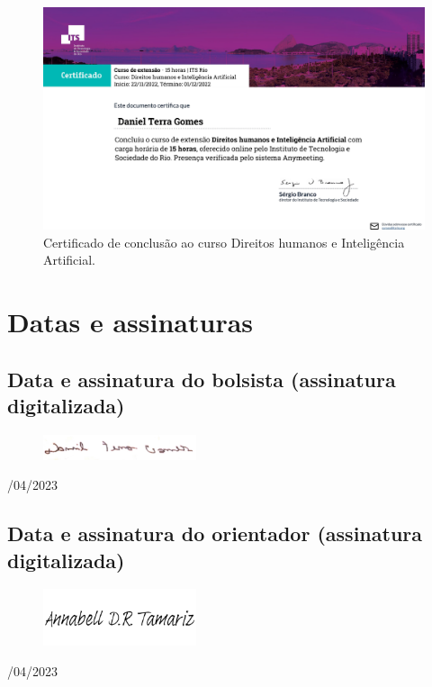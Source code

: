 \begin{figure}[H]
\centering
    \includegraphics[width=\textwidth]{Figures/its1.pdf}
\caption{Certificado de conclusão ao curso Direitos humanos e Inteligência Artificial.}
\label{Design}
\end{figure}



\chapter{Datas e assinaturas} \label{ass}

\section{Data e assinatura do bolsista (assinatura digitalizada)}


\begin{figure}[H]
 \centering
 \includegraphics[width=0.4\textwidth]{Figures/sign.png}
\end{figure}
/04/2023

\section{Data e assinatura do orientador (assinatura digitalizada)}


\begin{figure}[H]
 \centering
 \includegraphics[width=0.4\textwidth]{Figures/assinatura_annabell.png}
\end{figure}
/04/2023

